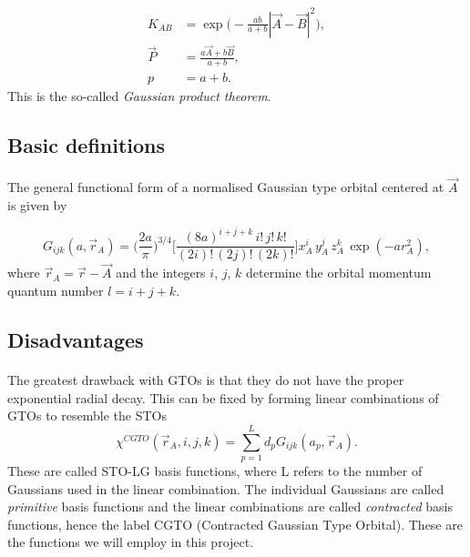 \documentclass[%
twoside,                 %
final,                   %
10pt]{article}
\begin{document}
\begin{align}
 K_{AB} & =  \exp\Big(-\frac{ab}{a + b}|\vec A - \vec B|^2\Big), \\
 \vec P & =  \frac{a \vec A + b \vec B}{a + b}, \\
 p & =  a + b.
\end{align}
This is the so-called \emph{Gaussian product theorem}.



\subsection{Basic definitions}

\paragraph{}

The general functional form of a normalised Gaussian type orbital 
centered at $\vec A$ is given by

\begin{equation}
 G_{ijk}(a, \vec r_A) = \Big(\frac{2a}{\pi}\Big)^{3/4}\Big[\frac{(8a)^{i+j+k}\,i!\,j!\,k!}{(2i)!\,(2j)!\,(2k)!}\Big]x_A^i\,y_A^j\,z_A^k\,\exp(-a r_A^2),
\end{equation}
where $\vec r_A = \vec r - \vec A$ and the integers $i$, $j$, $k$ determine the orbital momentum quantum number $l=i+j+k$.



\subsection{Disadvantages}

\paragraph{}

The greatest drawback with GTOs is that they do not have the proper exponential radial decay. This can be fixed by forming linear combinations of GTOs
to resemble the STOs
\begin{equation}
 \chi^{CGTO}(\vec r_A,i,j,k) = \sum_{p=1}^L d_p G_{ijk}(a_p, \vec r_A).
\end{equation}
These are called STO-LG basis functions, where L refers to the number of Gaussians used in the linear combination.
The individual Gaussians are called \emph{primitive} basis functions and the linear combinations are called \emph{contracted} basis functions, hence the label
CGTO (Contracted Gaussian Type Orbital). These are the functions we will employ in this project.
\end{document}
